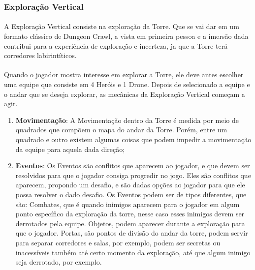 \documentclass[11pt]{article} %
\begin{document}
\subsubsection{Exploração Vertical}
\paragraph{}A Exploração Vertical consiste na exploração da Torre. Que se vai dar em um formato clássico de Dungeon Crawl, a vista em primeira pessoa e a imersão dada contribui para a experiência de exploração e incerteza, ja que a Torre terá corredores labirintíticos.

\paragraph{}Quando o jogador mostra interesse em explorar a Torre, ele deve antes escolher uma equipe que consiste em 4 Heróis e 1 Drone. Depois de selecionado a equipe e o andar que se deseja explorar, as mecânicas da Exploração Vertical começam a agir.

\begin{enumerate}
  \item \textbf{Movimentação}: A Movimentação dentro da Torre é medida por meio de quadrados que compõem o mapa do andar da Torre. Porém, entre um quadrado e outro existem algumas coisas que podem impedir a movimentação da equipe para aquela dada direção;
  \item \textbf{Eventos}: Os Eventos são conflitos que aparecem ao jogador, e que devem ser resolvidos para que o jogador consiga progredir no jogo. Eles são conflitos que aparecem, propondo um desafio, e são dadas opções ao jogador para que ele possa resolver o dado desafio. Os Eventos podem ser de tipos diferentes, que são: Combates, que é quando inimigos aparecem para o jogador em algum ponto específico da exploração da torre, nesse caso esses inimigos devem ser derrotados pela equipe. Objetos, podem aparecer durante a exploração para que o jogador. Portas, são pontos de divisão do andar da torre, podem servir para separar corredores e salas, por exemplo, podem ser secretas ou inacessíveis também até certo momento da exploração, até que algum inimigo seja derrotado, por exemplo.
\end{enumerate}
\newpage
\end{document}
